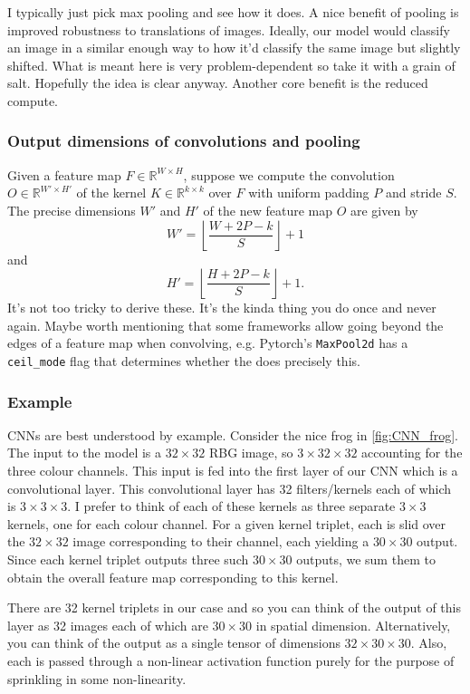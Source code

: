 \documentclass[11pt]{article}
\begin{document}
\noindent I typically just pick max pooling and see how it does. A nice benefit of pooling is improved robustness to translations of images. Ideally, our model would classify an image in a similar enough way to how it'd classify the same image but slightly shifted. What is meant here is very problem-dependent so take it with a grain of salt. Hopefully the idea is clear anyway. Another core benefit is the reduced compute.

\subsubsection*{Output dimensions of convolutions and pooling}
Given a feature map $F\in\mathbb{R}^{W\times H}$, suppose we compute the convolution $O\in\mathbb{R}^{W'\times H'}$ of the kernel $K\in\mathbb{R}^{k\times k}$ over $F$ with uniform padding $P$ and stride $S$. The precise dimensions $W'$ and $H'$ of the new feature map $O$ are given by
$$
W'
=
\left\lfloor
\frac{W+2P-k}{S}
\right\rfloor
+1
$$
and
$$
H'
=
\left\lfloor
\frac{H+2P-k}{S}
\right\rfloor
+1.
$$
It's not too tricky to derive these. It's the kinda thing you do once and never again. Maybe worth mentioning that some frameworks allow going beyond the edges of a feature map when convolving, e.g. Pytorch's \texttt{MaxPool2d} has a \texttt{ceil\_mode} flag that determines whether the does precisely this.

\subsubsection{Example}
CNNs are best understood by example. Consider the nice frog in \autoref{fig:CNN_frog}. The input to the model is a $32\times32$ RBG image, so $3\times32\times32$ accounting for the three colour channels. This input is fed into the first layer of our CNN which is a convolutional layer. This convolutional layer has 32 filters/kernels each of which is $3\times3\times3$. I prefer to think of each of these kernels as three separate $3\times3$ kernels, one for each colour channel. For a given kernel triplet, each is slid over the $32\times32$ image corresponding to their channel, each yielding a $30\times30$ output. Since each kernel triplet outputs three such $30\times30$ outputs, we sum them to obtain the overall feature map corresponding to this kernel.

There are 32 kernel triplets in our case and so you can think of the output of this layer as 32 images each of which are $30\times30$ in spatial dimension. Alternatively, you can think of the output as a single tensor of dimensions $32\times30\times30$. Also, each is passed through a non-linear activation function purely for the purpose of sprinkling in some non-linearity.
\end{document}
